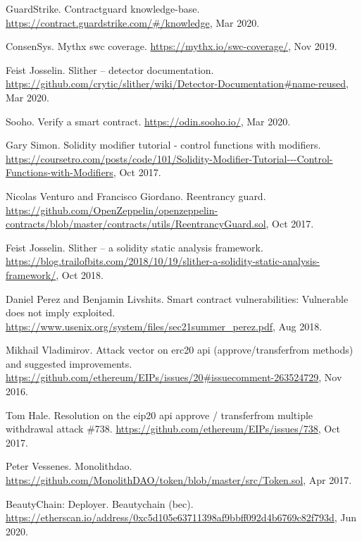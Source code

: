 \begin{thebibliography}{10}
GuardStrike.
\newblock Contractguard knowledge-base.
\newblock \url{https://contract.guardstrike.com/#/knowledge}, Mar 2020.

ConsenSys.
\newblock Mythx swc coverage.
\newblock \url{https://mythx.io/swc-coverage/}, Nov 2019.

Feist Josselin.
\newblock Slither -- detector documentation.
\newblock
  \url{https://github.com/crytic/slither/wiki/Detector-Documentation#name-reused},
  Mar 2020.

Sooho.
\newblock Verify a smart contract.
\newblock \url{https://odin.sooho.io/}, Mar 2020.

Gary Simon.
\newblock Solidity modifier tutorial - control functions with modifiers.
\newblock
  \url{https://coursetro.com/posts/code/101/Solidity-Modifier-Tutorial---Control-Functions-with-Modifiers},
  Oct 2017.

Nicolas Venturo and Francisco Giordano.
\newblock Reentrancy guard.
\newblock
  \url{https://github.com/OpenZeppelin/openzeppelin-contracts/blob/master/contracts/utils/ReentrancyGuard.sol},
  Oct 2017.

Feist Josselin.
\newblock Slither -- a solidity static analysis framework.
\newblock
  \url{https://blog.trailofbits.com/2018/10/19/slither-a-solidity-static-analysis-framework/},
  Oct 2018.

Daniel Perez and Benjamin Livshits.
\newblock Smart contract vulnerabilities: Vulnerable does not imply exploited.
\newblock \url{https://www.usenix.org/system/files/sec21summer_perez.pdf}, Aug
  2018.

Mikhail Vladimirov.
\newblock Attack vector on erc20 api (approve/transferfrom methods) and
  suggested improvements.
\newblock
  \url{https://github.com/ethereum/EIPs/issues/20\#issuecomment-263524729}, Nov
  2016.

Tom Hale.
\newblock Resolution on the eip20 api approve / transferfrom multiple
  withdrawal attack \#738.
\newblock \url{https://github.com/ethereum/EIPs/issues/738}, Oct 2017.

Peter Vessenes.
\newblock Monolithdao.
\newblock \url{https://github.com/MonolithDAO/token/blob/master/src/Token.sol},
  Apr 2017.

BeautyChain: Deployer.
\newblock Beautychain (bec).
\newblock
  \url{https://etherscan.io/address/0xc5d105e63711398af9bbff092d4b6769c82f793d},
  Jun 2020.


\end{thebibliography}

